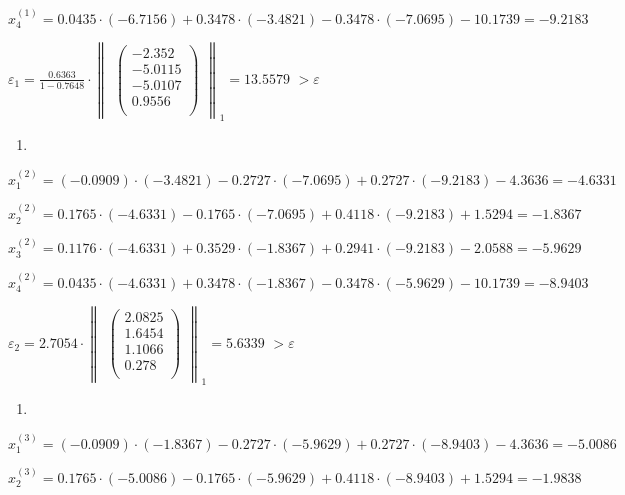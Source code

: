 \documentclass[10pt, a4paper]{scrartcl}
\begin{document}
\(\displaystyle x_4^{(1)} = 0.0435\cdot(-6.7156) + 0.3478\cdot(-3.4821) - 0.3478\cdot(-7.0695) - 10.1739 = -9.2183\)

\(\displaystyle \varepsilon_1 = \frac{0.6363}{1 - 0.7648} \cdot \begin{Vmatrix}\begin{pmatrix} -2.352\\ -5.0115\\ -5.0107\\ 0.9556\\ \end{pmatrix}\end{Vmatrix} _1 = \mathbf{13.5579}\)
\(\displaystyle > \varepsilon\)

\begin{enumerate}
\def\labelenumi{\arabic{enumi})}
\setcounter{enumi}{1}
\item
\end{enumerate}

\(\displaystyle x_1^{(2)} = (-0.0909)\cdot(-3.4821) - 0.2727\cdot(-7.0695) + 0.2727\cdot(-9.2183) - 4.3636 = -4.6331\)

\(\displaystyle x_2^{(2)} = 0.1765\cdot(-4.6331) - 0.1765\cdot(-7.0695) + 0.4118\cdot(-9.2183) + 1.5294 = -1.8367\)

\(\displaystyle x_3^{(2)} = 0.1176\cdot(-4.6331) + 0.3529\cdot(-1.8367) + 0.2941\cdot(-9.2183) - 2.0588= -5.9629\)

\(\displaystyle x_4^{(2)} = 0.0435\cdot(-4.6331) + 0.3478\cdot(-1.8367) - 0.3478\cdot(-5.9629) - 10.1739 = -8.9403\)

\(\displaystyle \varepsilon_2 = 2.7054 \cdot \begin{Vmatrix}\begin{pmatrix} 2.0825\\ 1.6454\\ 1.1066\\ 0.278\\ \end{pmatrix}\end{Vmatrix} _1 = \mathbf{5.6339}\)
\(\displaystyle > \varepsilon\)

\begin{enumerate}
\def\labelenumi{\arabic{enumi})}
\setcounter{enumi}{2}
\item
\end{enumerate}

\(\displaystyle x_1^{(3)} = (-0.0909)\cdot(-1.8367) - 0.2727\cdot(-5.9629) + 0.2727\cdot(-8.9403) - 4.3636 = -5.0086\)

\(\displaystyle x_2^{(3)} = 0.1765\cdot(-5.0086) - 0.1765\cdot(-5.9629) + 0.4118\cdot(-8.9403) + 1.5294 = -1.9838\)
\end{document}

